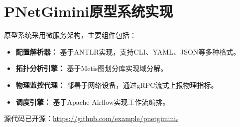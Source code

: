\documentclass[12pt,a4paper]{article}
\begin{document}
\section{PNetGimini原型系统实现}
\label{app:implementation}

原型系统采用微服务架构，主要组件包括：
\begin{itemize}
    \item \textbf{配置解析器：} 基于ANTLR实现，支持CLI、YAML、JSON等多种格式。
    \item \textbf{拓扑分析引擎：} 基于Metis图划分库实现域分解。
    \item \textbf{物理监控代理：} 部署于网络设备，通过gRPC流式上报物理指标。
    \item \textbf{调度引擎：} 基于Apache Airflow实现工作流编排。
\end{itemize}
源代码已开源：\url{https://github.com/example/pnetgimini}。
\end{document}
